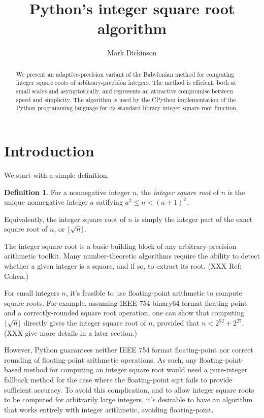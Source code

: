 \documentclass[a4paper]{article}
\title{Python's integer square root algorithm}
\author{Mark Dickinson}
\DeclarePairedDelimiter\floor{\lfloor}{\rfloor}
\theoremstyle{plain}
\theoremstyle{definition}
\newtheorem{definition}[theorem]{Definition}
\begin{document}
\lstset{language=Python}
\maketitle
\begin{abstract}
We present an adaptive-precision variant of the Babylonian method for computing
integer square roots of arbitrary-precision integers. The method is efficient,
both at small scales and asymptotically, and represents an attractive
compromise between speed and simplicity. The algorithm is used by the CPython
implementation of the Python programming language for its standard library
integer square root function.
\end{abstract}
\section{Introduction}

We start with a simple definition.

\begin{definition}
  For a nonnegative integer $n$, the \emph{integer square root} of $n$ is
  the unique nonnegative integer $a$ satifying $a^2 \le n < (a + 1)^2$.
\end{definition}

Equivalently, the integer square root of $n$ is simply the integer part
of the exact square root of $n$, or $\floor{\sqrt n}$.

The integer square root is a basic building block of any arbitrary-precision
arithmetic toolkit. Many number-theoretic algorithms require the ability
to detect whether a given integer is a square, and if so, to extract its
root. (XXX Ref: Cohen.)

For small integers $n$, it's feasible to use floating-point arithmetic to
compute square roots. For example, assuming IEEE 754 binary64 format
floating-point and a correctly-rounded square root operation, one can
show that computing $\floor{\sqrt n}$ directly gives the integer square root of
$n$, provided that $n < 2^{52} + 2^{27}$. (XXX give more details in a later
section.)

However, Python guarantees neither IEEE 754 format floating-point nor correct
rounding of floating-point arithmetic operations. As such, any
floating-point-based method for computing an integer square root would need a
pure-integer fallback method for the case where the floating-point sqrt
fails to provide sufficient accuracy. To avoid this complication, and to allow
integer square roots to be computed for arbitrarily large integers, it's desirable
to have an algorithm that works entirely with integer arithmetic, avoiding
floating-point.
\end{document}
